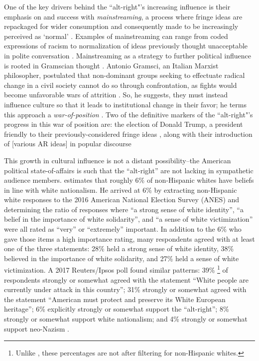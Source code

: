 \documentclass[acmlarge, screen, authorversion]{acmart}
\begin{document}
One of the key drivers behind the “alt-right"’s increasing influence is their emphasis on and success with \textit{mainstreaming}, a process where fringe ideas are repackaged for wider consumption and consequently made to be increasingly perceived as `normal' \cite{sternProudBoysWhite2019, mainRiseAltRight2018, cammaertsMainstreamingExtremeRightWing2018}. Examples of mainstreaming can range from coded
expressions of racism to normalization of ideas previously thought
unacceptable in polite conversation \cite{cammaertsMainstreamingExtremeRightWing2018}. Mainstreaming as a
strategy to further political influence is rooted in Gramscian thought
\cite{nagleKillAllNormies2017, sternProudBoysWhite2019}. Antonio Gramsci, an Italian Marxist philosopher, postulated that
non-dominant groups seeking to effectuate radical change in a civil
society cannot do so through confrontation, as fights would become
unfavorable wars of attrition \cite{delzellAntonioGramsciOrigins1967}. So, he suggests, they must instead influence culture so that it leads to institutional change in their favor; he terms this approach a \textit{war-of-position} \cite{buttigiegGramsciCivilSociety1995}. Two of the definitive markers of the ``alt-right"’s progress in
this war of position are: the election of Donald Trump, a president
friendly to their previously-considered fringe ideas \cite{brydenUnderlyingSociopoliticalProcesses2019}, along
with their introduction of [various AR ideas] in popular discourse

This growth in cultural influence is not a distant possibility–the
American political state-of-affairs is such that the “alt-right” are not lacking in sympathetic audience members. \citet{hawleyDemographyAltRight2018} estimates that roughly 6\% of
non-Hispanic whites have beliefs in line with white nationalism. He
arrived at 6\% by extracting non-Hispanic white responses to the 2016
American National Election Survey (ANES) and determining the ratio of
responses where “a strong sense of white identity”, “a belief in the
importance of white solidarity”, and “a sense of white victimization” were
all rated as “very” or “extremely” important. In addition to the 6\% who
gave those items a high importance rating, many respondents agreed with
at least one of the three statements: 28\% held a strong sense of white
identity, 38\% believed in the importance of white solidarity, and 27\%
held a sense of white victimization. A 2017 Reuters/Ipsos poll found
similar patterns: 39\% \footnote{Unlike \citet{hawleyDemographyAltRight2018}, these percentages are not after
filtering for non-Hispanic whites.} of respondents strongly or somewhat
agreed with the statement “White people are currently under attack in
this country”; 31\% strongly or somewhat agreed with the statement
“American must protect and preserve its White European heritage”; 6\%
explicitly strongly or somewhat support the “alt-right”; 8\% strongly or
somewhat support white nationalism; and 4\% strongly or somewhat support
neo-Nazism \cite{politicsNewPollAmericans}.
\end{document}

